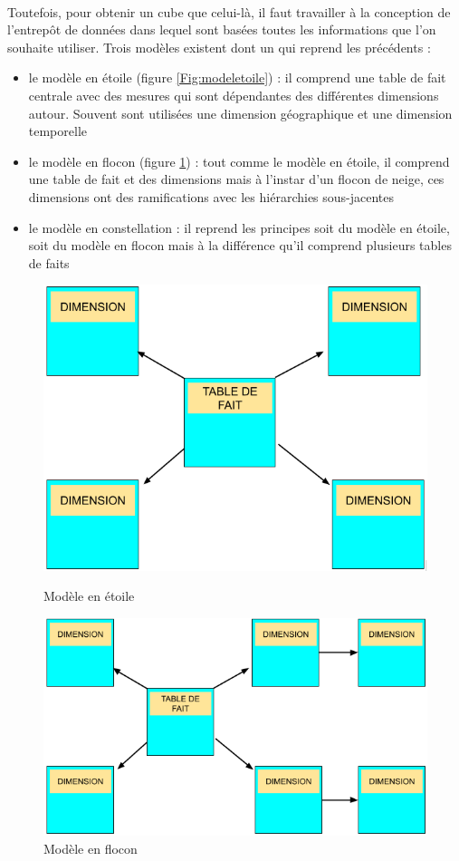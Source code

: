 \paragraph{}Toutefois, pour obtenir un cube que celui-là, il faut travailler à la conception de l'entrepôt de données dans lequel sont basées toutes les informations que l'on souhaite utiliser. Trois modèles existent dont un qui reprend les précédents :
\begin{itemize}[label=\textbullet]
    \item le modèle en étoile (figure \ref{Fig:modeletoile}) : il comprend une table de fait centrale avec des mesures qui sont dépendantes des différentes dimensions autour. Souvent sont utilisées une dimension géographique et une dimension temporelle
    \item le modèle en flocon (figure \ref{Fig:modelflocon}) : tout comme le modèle en étoile, il comprend une table de fait et des dimensions mais à l'instar d'un flocon de neige, ces dimensions ont des ramifications avec les hiérarchies sous-jacentes
    \item le modèle en constellation : il reprend les principes soit du modèle en étoile, soit du modèle en flocon mais à la différence qu'il comprend plusieurs tables de faits
\end{itemize}
\begin{figure}[!htb]
   \begin{minipage}{0.48\textwidth}
     \centering
     \includegraphics[width=.6\linewidth]{./src_img/Star-schema.png}
     \caption{Modèle en étoile}\label{Fig:modeletoile}
   \end{minipage}\hfill
   \begin{minipage}{0.48\textwidth}
     \centering
     \includegraphics[width=.7\linewidth]{./src_img/SnowFlake-schema.png}
     \caption{Modèle en flocon}\label{Fig:modelflocon}
   \end{minipage}
\end{figure}
